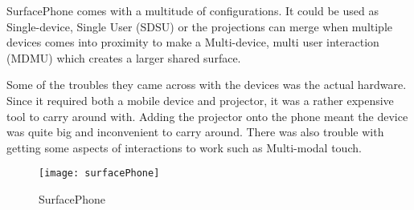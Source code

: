 SurfacePhone comes with a multitude of configurations. It could be
used as Single-device, Single User (SDSU) or the projections can merge
when multiple devices comes into proximity to make a Multi-device,
multi user interaction (MDMU) which creates a larger shared surface. 

Some of the troubles they came across with the devices was the actual
hardware. Since it required both a mobile device and projector, it
was a rather expensive tool to carry around with. Adding the projector
onto the phone meant the device was quite big and inconvenient to carry around. There was also
trouble with getting some aspects of interactions to work such as
Multi-modal touch.
\begin{figure}[H]
\centering
\texttt{[image: surfacePhone]}

\protect\caption{SurfacePhone}


\end{figure}

